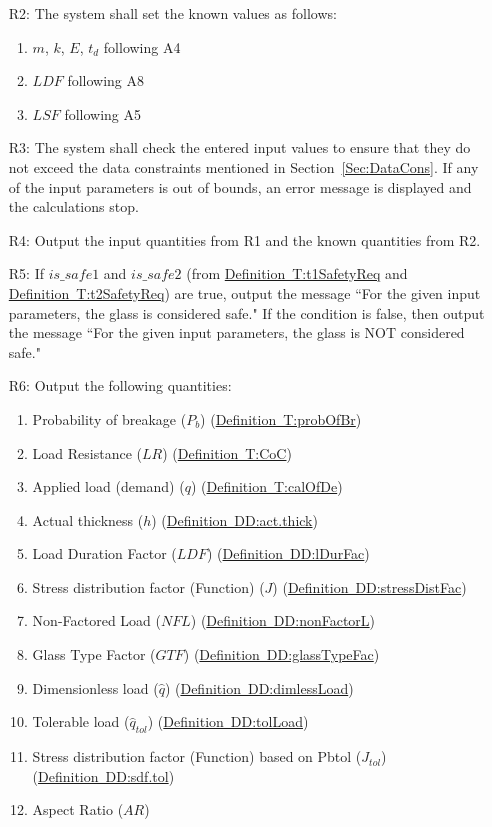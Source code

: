 \documentclass[12pt]{article}
\begin{document}
\begin{itemize}
\item[R2:]The system shall set the known values as follows:
          \begin{enumerate}
          \item{$m$, $k$, $E$, $t_{d}$ following A4}
          \item{$LDF$ following A8}
          \item{$LSF$ following A5}
          \end{enumerate}
\item[R3:]The system shall check the entered input values to ensure that they do not exceed the data constraints mentioned in Section~\ref{Sec:DataCons}. If any of the input parameters is out of bounds, an error message is displayed and the calculations stop.
\item[R4:]Output the input quantities from R1 and the known quantities from R2.
\item[R5:]If $is\_safe1$ and $is\_safe2$ (from \hyperref[T:t1SafetyReq]{Definition~T:t1SafetyReq} and \hyperref[T:t2SafetyReq]{Definition~T:t2SafetyReq}) are true, output the message ``For the given input parameters, the glass is considered safe." If the condition is false, then output the message ``For the given input parameters, the glass is NOT considered safe."
\item[R6:]Output the following quantities:
          \begin{enumerate}
          \item{Probability of breakage ($P_{b}$) (\hyperref[T:probOfBr]{Definition~T:probOfBr})}
          \item{Load Resistance ($LR$) (\hyperref[T:CoC]{Definition~T:CoC})}
          \item{Applied load (demand) ($q$) (\hyperref[T:calOfDe]{Definition~T:calOfDe})}
          \item{Actual thickness ($h$) (\hyperref[DD:act.thick]{Definition~DD:act.thick})}
          \item{Load Duration Factor ($LDF$) (\hyperref[DD:lDurFac]{Definition~DD:lDurFac})}
          \item{Stress distribution factor (Function) ($J$) (\hyperref[DD:stressDistFac]{Definition~DD:stressDistFac})}
          \item{Non-Factored Load ($NFL$) (\hyperref[DD:nonFactorL]{Definition~DD:nonFactorL})}
          \item{Glass Type Factor ($GTF$) (\hyperref[DD:glassTypeFac]{Definition~DD:glassTypeFac})}
          \item{Dimensionless load ($\hat{q}$) (\hyperref[DD:dimlessLoad]{Definition~DD:dimlessLoad})}
          \item{Tolerable load ($\hat{q}_{tol}$) (\hyperref[DD:tolLoad]{Definition~DD:tolLoad})}
          \item{Stress distribution factor (Function) based on Pbtol ($J_{tol}$) (\hyperref[DD:sdf.tol]{Definition~DD:sdf.tol})}
          \item{Aspect Ratio ($AR$)}
          \end{enumerate}
\end{itemize}
\end{document}
